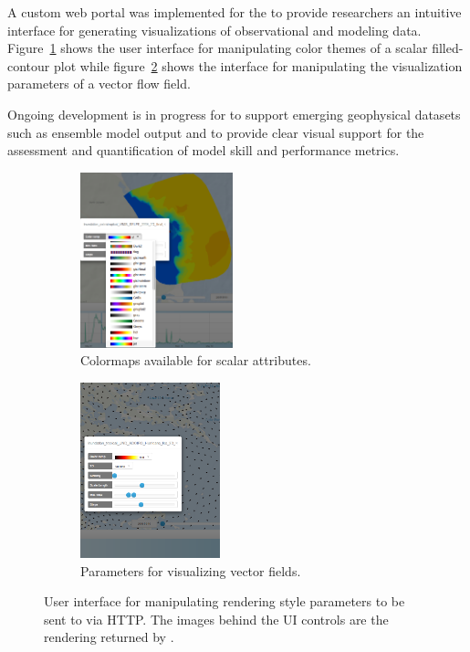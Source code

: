 A custom web portal was implemented for the \comt{} \ioos{} to provide
researchers an intuitive interface for generating visualizations of
observational and modeling data. Figure~\ref{fig:ui_colormaps_scalar}
shows the user interface for manipulating color themes of a scalar
filled-contour plot while figure~\ref{fig:ui_vector} shows the
interface for manipulating the visualization parameters of a vector
flow field.

Ongoing development is in progress for \sciwms{} to support emerging
geophysical datasets such as ensemble model output and to provide
clear visual support for the assessment and quantification of model
skill and performance metrics.



\begin{figure}[ht!]
  \centering
  \begin{subfigure}[t]{0.45\textwidth}
    \centering
    \includegraphics[height=2in]{../figs/inundation_extratropical_VIMS_SELFE_2005_final_run_waves_UI_scalar}
    \caption{Colormaps available for scalar attributes.}
    \label{fig:ui_colormaps_scalar}
  \end{subfigure}
  \begin{subfigure}[t]{0.45\textwidth}
    \centering
    \includegraphics[height=2in]{../figs/ui_vectors_crop_inundation_tropical_UND_ADCIRC_Hurricane_Ike_3d_final_run_with_waves}
    \caption{Parameters for visualizing vector fields.}
  \end{subfigure}
  \caption{User interface for manipulating rendering style parameters
    to be sent to \sciwms{} via HTTP. The images behind the UI
    controls are the rendering returned by \sciwms{}.}
  \label{fig:ui_vector}
\end{figure}

